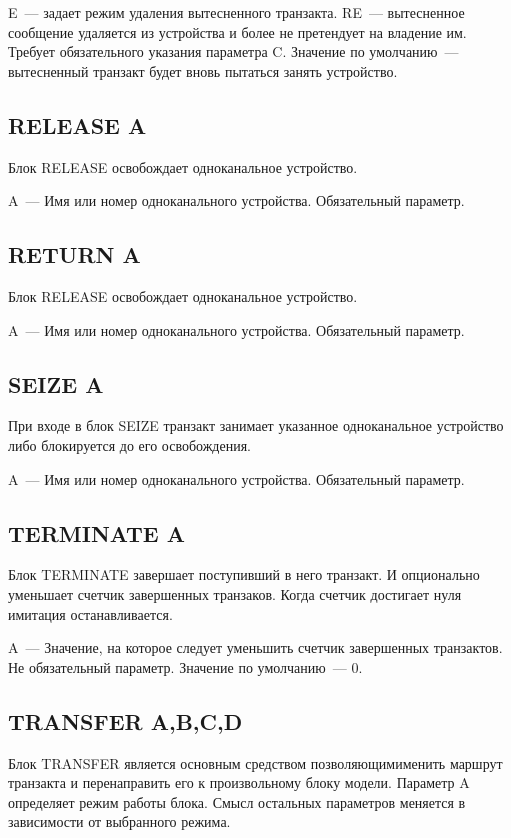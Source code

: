 E~--- задает режим удаления вытесненного транзакта. RE~--- вытесненное сообщение удаляется из устройства и более не претендует на владение им. Требует обязательного указания параметра C. Значение по умолчанию~--- вытесненный транзакт будет вновь пытаться занять устройство. 

\subsection*{RELEASE A}

Блок RELEASE освобождает одноканальное устройство.

A~--- Имя или номер одноканального устройства. Обязательный параметр.

\subsection*{RETURN A}

Блок RELEASE освобождает одноканальное устройство.

A~--- Имя или номер одноканального устройства. Обязательный параметр.

\subsection*{SEIZE A}

При входе в блок SEIZE транзакт занимает указанное одноканальное устройство либо блокируется до его освобождения.

A~--- Имя или номер одноканального устройства. Обязательный параметр.

\subsection*{TERMINATE A}

Блок TERMINATE завершает поступивший в него транзакт. И опционально уменьшает счетчик завершенных транзаков. Когда счетчик достигает нуля имитация останавливается.

A~--- Значение, на которое следует уменьшить счетчик завершенных транзактов. Не обязательный параметр. Значение по умолчанию~--- 0.

\subsection*{TRANSFER A,B,C,D}

Блок TRANSFER является основным средством позволяющимименить маршрут транзакта и перенаправить его к произвольному блоку модели. Параметр A определяет режим работы блока. Смысл остальных параметров меняется в зависимости от выбранного режима.

